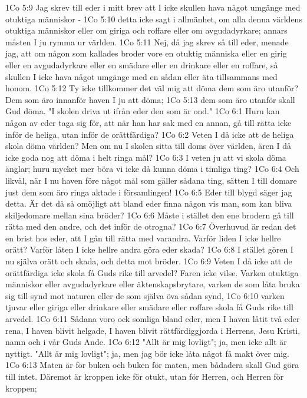 1Co 5:9  Jag skrev till eder i mitt brev att I icke skullen hava något umgänge med otuktiga människor -
1Co 5:10  detta icke sagt i allmänhet, om alla denna världens otuktiga människor eller om giriga och roffare eller om avgudadyrkare; annars måsten I ju rymma ur världen.
1Co 5:11  Nej, då jag skrev så till eder, menade jag, att om någon som kallades broder vore en otuktig människa eller en girig eller en avgudadyrkare eller en smädare eller en drinkare eller en roffare, så skullen I icke hava något umgänge med en sådan eller äta tillsammans med honom.
1Co 5:12  Ty icke tillkommer det väl mig att döma dem som äro utanför? Dem som äro innanför haven I ju att döma;
1Co 5:13  dem som äro utanför skall Gud döma. "I skolen driva ut ifrån eder den som är ond."
1Co 6:1  Huru kan någon av eder taga sig för, att när han har sak med en annan, gå till rätta icke inför de heliga, utan inför de orättfärdiga?
1Co 6:2  Veten I då icke att de heliga skola döma världen? Men om nu I skolen sitta till doms över världen, ären I då icke goda nog att döma i helt ringa mål?
1Co 6:3  I veten ju att vi skola döma änglar; huru mycket mer böra vi icke då kunna döma i timliga ting?
1Co 6:4  Och likväl, när I nu haven före något mål som gäller sådana ting, sätten I till domare just dem som äro ringa aktade i församlingen!
1Co 6:5  Eder till blygd säger jag detta. Är det då så omöjligt att bland eder finna någon vis man, som kan bliva skiljedomare mellan sina bröder?
1Co 6:6  Måste i stället den ene brodern gå till rätta med den andre, och det inför de otrogna?
1Co 6:7  Överhuvud är redan det en brist hos eder, att I gån till rätta med varandra. Varför liden I icke hellre orätt? Varför låten I icke hellre andra göra eder skada?
1Co 6:8  I stället gören I nu själva orätt och skada, och detta mot bröder.
1Co 6:9  Veten I då icke att de orättfärdiga icke skola få Guds rike till arvedel? Faren icke vilse. Varken otuktiga människor eller avgudadyrkare eller äktenskapsbrytare, varken de som låta bruka sig till synd mot naturen eller de som själva öva sådan synd,
1Co 6:10  varken tjuvar eller giriga eller drinkare eller smädare eller roffare skola få Guds rike till arvedel.
1Co 6:11  Sådana voro ock somliga bland eder, men I haven låtit två eder rena, I haven blivit helgade, I haven blivit rättfärdiggjorda i Herrens, Jesu Kristi, namn och i vår Guds Ande.
1Co 6:12  "Allt är mig lovligt"; ja, men icke allt är nyttigt. "Allt är mig lovligt"; ja, men jag bör icke låta något få makt över mig.
1Co 6:13  Maten är för buken och buken för maten, men bådadera skall Gud göra till intet. Däremot är kroppen icke för otukt, utan för Herren, och Herren för kroppen;
